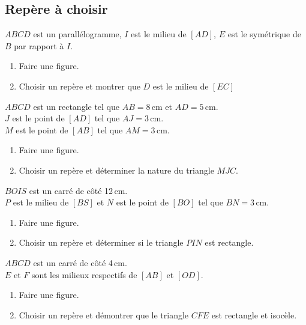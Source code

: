 \begin{multicols}{2}
\begin{exo}
\end{exo}

\subsection{Rep\`ere \`a choisir}

\begin{exo}
 $ABCD$ est un parall\'elogramme, $I$ est le milieu de $[AD]$, $E$ est le sym\'etrique de $B$ par rapport \`a $I$.
\begin{enumerate}
 \item Faire une figure.
 \item Choisir un rep\`ere et montrer que $D$ est le milieu de $[EC]$
\end{enumerate}
\end{exo}

\begin{exo}
 $ABCD$ est un rectangle tel que $AB=8$\,cm et $AD=5$\,cm.\\
 $J$ est le point de $[AD]$ tel que $AJ=3$\,cm.\\
 $M$ est le point de $[AB]$ tel que $AM=3$\,cm.
\begin{enumerate}
 \item Faire une figure.
 \item Choisir un rep\`ere et d\'eterminer la nature du triangle $MJC$.
\end{enumerate}

\end{exo}

\begin{exo}
 $BOIS$ est un carr\'e de c\^ot\'e 12\,cm.\\
 $P$ est le milieu de $[BS]$ et $N$ est le point de $[BO]$ tel que $BN=3$\,cm.
 \begin{enumerate}
 \item Faire une figure.
 \item Choisir un rep\`ere et d\'eterminer si le triangle $PIN$ est rectangle.
\end{enumerate}
\end{exo}

\begin{exo}
 $ABCD$ est un carr\'e de c\^ot\'e 4\,cm.\\
 $E$ et $F$ sont les milieux respectifs de $[AB]$ et $[OD]$.
 \begin{enumerate}
 \item Faire une figure.
 \item Choisir un rep\`ere et d\'emontrer que le triangle $CFE$ est rectangle et isoc\`ele.
\end{enumerate}
\end{exo}



\end{multicols}
